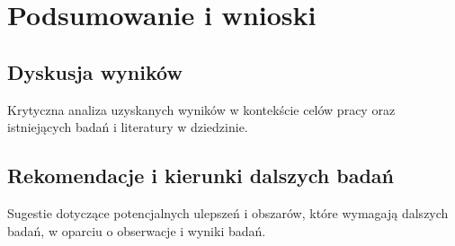 \chapter{Podsumowanie i wnioski}



\section{Dyskusja wyników}


Krytyczna analiza uzyskanych wyników w kontekście celów pracy oraz istniejących badań i literatury w dziedzinie.



\section{Rekomendacje i kierunki dalszych badań}


Sugestie dotyczące potencjalnych ulepszeń i obszarów, które wymagają dalszych badań, w oparciu o obserwacje i wyniki badań.
